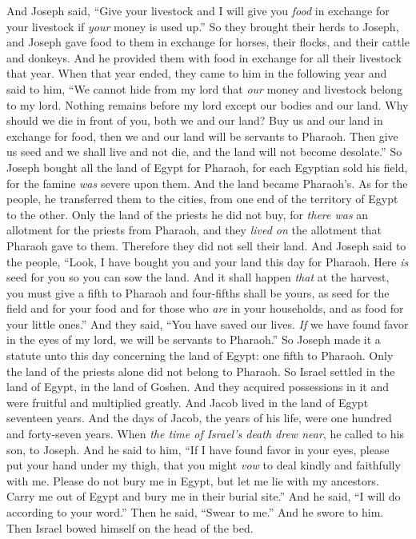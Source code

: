 \begin{biblechapter}
\verse And Joseph said, “Give your livestock and I will give you \textit{food} in exchange for your livestock if \textit{your} money is used up.”
\verse So they brought their herds to Joseph, and Joseph gave food to them in exchange for horses, their flocks, and their cattle and donkeys. And he provided them with food in exchange for all their livestock that year.
\verse When that year ended, they came to him in the following year and said to him, “We cannot hide from my lord that \textit{our} money and livestock belong to my lord. Nothing remains before my lord except our bodies and our land.
\verse Why should we die in front of you, both we and our land? Buy us and our land in exchange for food, then we and our land will be servants to Pharaoh. Then give us seed and we shall live and not die, and the land will not become desolate.”
\verse So Joseph bought all the land of Egypt for Pharaoh, for each Egyptian sold his field, for the famine \textit{was} severe upon them. And the land became Pharaoh’s.
\verse As for the people, he transferred them to the cities, from one end of the territory of Egypt to the other.
\verse Only the land of the priests he did not buy, for \textit{there was} an allotment for the priests from Pharaoh, and they \textit{lived on} the allotment that Pharaoh gave to them. Therefore they did not sell their land.
\verse And Joseph said to the people, “Look, I have bought you and your land this day for Pharaoh. Here \textit{is} seed for you so you can sow the land.
\verse And it shall happen \textit{that} at the harvest, you must give a fifth to Pharaoh and four-fifths shall be yours, as seed for the field and for your food and for those who \textit{are} in your households, and as food for your little ones.”
\verse And they said, “You have saved our lives. \textit{If} we have found favor in the eyes of my lord, we will be servants to Pharaoh.”
\verse So Joseph made it a statute unto this day concerning the land of Egypt: one fifth to Pharaoh. Only the land of the priests alone did not belong to Pharaoh.
\verse So Israel settled in the land of Egypt, in the land of Goshen. And they acquired possessions in it and were fruitful and multiplied greatly.
\verse And Jacob lived in the land of Egypt seventeen years. And the days of Jacob, the years of his life, were one hundred and forty-seven years.
\verse When \textit{the time of Israel’s death drew near}, he called to his son, to Joseph. And he said to him, “If I have found favor in your eyes, please put your hand under my thigh, that you might \textit{vow} to deal kindly and faithfully with me. Please do not bury me in Egypt,
\verse but let me lie with my ancestors. Carry me out of Egypt and bury me in their burial site.” And he said, “I will do according to your word.”
\verse Then he said, “Swear to me.” And he swore to him. Then Israel bowed himself on the head of the bed.
\end{biblechapter}

